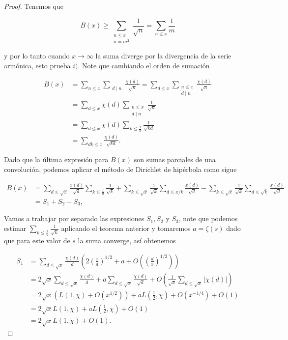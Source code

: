 \begin{proof}
Tenemos que

$$B(x)\geq \sum_{\substack{n\leq x\\
n=m^2}}\frac{1}{\sqrt{n}}=\sum_{n\leq x} \frac{1}{m} $$

y por lo tanto cuando $x\to \infty$ la suma diverge por la divergencia de la serie armónica, esto prueba $i)$. Note que cambiando el orden de sumación

\begin{align*}
    B(x) &= \sum_{n \leq x} \sum_{\substack{d \mid n}} \frac{\chi(d)}{\sqrt{n}} 
     = \sum_{d \leq x} \sum_{\substack{n \leq x \\ d \mid n}} \frac{\chi(d)}{\sqrt{n}}\\
     &= \sum_{d \leq x} \chi(d) \sum_{\substack{n \leq x \\ d \mid n}} \frac{1}{\sqrt{n}}\\
     &= \sum_{d \leq x} \chi(d) \sum_{k \leq \frac{x}{d}} \frac{1}{\sqrt{kd}}\\
     &=\sum_{dk \leq x} \frac{\chi(d)}{\sqrt{kd}}
.\end{align*}

Dado que la última expresión para $B(x)$ son sumas parciales de una convolución, podemos aplicar el método de Dirichlet de hipérbola como sigue

$$\begin{aligned}
B(x)& =\sum_{d \leqslant \sqrt{x}} \frac{x(d)}{\sqrt{d}} \sum_{k \leq\frac{x}{d}} \frac{1}{\sqrt{k}}+\sum_{k \leqslant \sqrt{x}} \frac{1}{\sqrt{k}} \sum_{d\leq x / k} \frac{x(d)}{\sqrt{d}}-\sum_{k \leqslant \sqrt{x}} \frac{1}{\sqrt{k}} \sum_{d \leqslant \sqrt{k}} \frac{x(d)}{\sqrt{d}} \\
& =S_1+S_2-S_3,
\end{aligned}$$


Vamos a trabajar por separado las expresiones $S_1, S_2$ y $S_3$, note que podemos estimar $\displaystyle \sum_{k\leq \frac{x}{d}} \frac{1}{\sqrt{k}}$ aplicando  el teorema anterior y tomaremos $a=\zeta(s)$ dado que para este valor de $s$ la suma converge, así obtenemos

\begin{align*}
S_1 &= \sum_{d \leq \sqrt{x}} \frac{\chi(d)}{d} 
\left( 2 \left( \frac{x}{d} \right)^{1/2} +a + O\left( \left( \frac{d}{x} \right)^{1/2} \right) \right) \\
&= 2\sqrt{x} \sum_{d \leq \sqrt{x}} \frac{\chi(d)}{d} 
+ a \sum_{d \leq \sqrt{x}} \frac{\chi(d)}{\sqrt{d}} 
+ O\left( \frac{1}{\sqrt{x}} \sum_{d \leq \sqrt{x}} |\chi(d)| \right) \\
&= 2\sqrt{x} \left( L(1, \chi) + O(x^{1/2}) \right) 
+ a L\left(\frac{1}{2}, \chi\right) + O\left(x^{-1/4}\right) + O(1) \\
&= 2\sqrt{x} L(1, \chi) + a L\left(\frac{1}{2}, \chi\right) + O(1) \\
&= 2\sqrt{x} L(1, \chi) + O(1).
\end{align*}


\end{proof}

